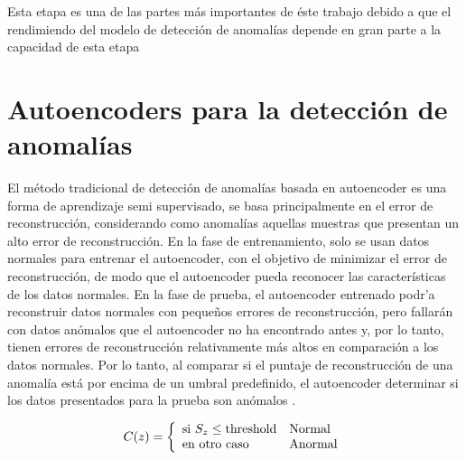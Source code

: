 Esta etapa es una de las partes m\'{a}s importantes de \'{e}ste trabajo debido a que el rendimiendo del modelo de detecci\'{o}n de anomal\'{i}as depende en gran parte a la capacidad  de esta etapa
 
 

\section{Autoencoders para la detecci\'{o}n de anomal\'{i}as}

El m\'{e}todo tradicional de detecci\'{o}n de anomal\'{i}as basada en autoencoder es una forma de aprendizaje semi supervisado, se basa principalmente en el error de reconstrucci\'{o}n, considerando como anomal\'{i}as aquellas muestras que presentan un alto error de reconstrucci\'{o}n. En la fase de entrenamiento, solo se usan datos normales para entrenar el autoencoder, con el objetivo de minimizar el error de reconstrucci\'{o}n, de modo que el autoencoder pueda reconocer las caracter\'{i}sticas de los datos normales. En la fase de prueba, el autoencoder entrenado podr'{a} reconstruir datos normales con peque\~{n}os errores de reconstrucci\'{o}n, pero fallar\'{a}n con datos an\'{o}malos que el autoencoder no ha encontrado antes y, por lo tanto, tienen errores de reconstrucci\'{o}n relativamente m\'{a}s altos en comparaci\'{o}n a los datos normales. Por lo tanto, al comparar si el puntaje de reconstrucci\'{o}n de una anomal\'{i}a est\'{a} por encima de un umbral predefinido, el autoencoder determinar si los datos presentados para la prueba son an\'{o}malos \cite{47}.

\begin{equation}
C(z) = \left\lbrace
\begin{array}{ll}
\textup{si } S_{z}\leq \textup{threshold} & \textup{Normal}\\
\textup{en otro caso } & \textup{Anormal}
\end{array}
\right.
\end{equation}



\vspace{5mm} %
